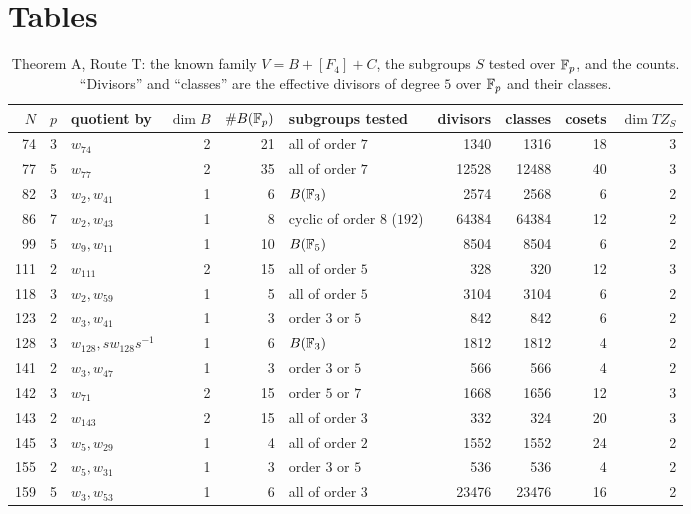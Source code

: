 \section{Tables}\label{sec:tables}



\begingroup\small

\endgroup

\begingroup\small

\endgroup

\begin{table}[ht]\centering\small
\caption{Projections to intermediate curves (other than $X_0$) used in the proof of Theorem B.}\label{tab:projection}

\end{table}



\begin{table}[ht]\centering\small
\caption{Theorem A, Route T: the known family $V=B+[F_4]+C$, the subgroups $S$ tested over $\mathbb{F}_p$, and the
counts. ``Divisors'' and ``classes'' are the effective divisors of degree $5$ over $\mathbb{F}_p$ and their classes.}
\label{tab:routeT}
\setlength{\tabcolsep}{4pt}
\begin{tabular}{rrlrrlrrrr}\toprule
$N$&$p$&quotient by&$\dim B$&$\#B(\mathbb{F}_p)$&subgroups tested&divisors&classes&cosets&$\dim T Z_S$\\\midrule
74&3&$w_{74}$&2&21&all of order $7$&1340&1316&18&3\\
77&5&$w_{77}$&2&35&all of order $7$&12528&12488&40&3\\
82&3&$w_2,w_{41}$&1&6&$B(\mathbb{F}_3)$&2574&2568&6&2\\
86&7&$w_2,w_{43}$&1&8&cyclic of order $8$ ($192$)&64384&64384&12&2\\
99&5&$w_9,w_{11}$&1&10&$B(\mathbb{F}_5)$&8504&8504&6&2\\
111&2&$w_{111}$&2&15&all of order $5$&328&320&12&3\\
118&3&$w_2,w_{59}$&1&5&all of order $5$&3104&3104&6&2\\
123&2&$w_3,w_{41}$&1&3&order $3$ or $5$&842&842&6&2\\
128&3&$w_{128},sw_{128}s^{-1}$&1&6&$B(\mathbb{F}_3)$&1812&1812&4&2\\
141&2&$w_3,w_{47}$&1&3&order $3$ or $5$&566&566&4&2\\
142&3&$w_{71}$&2&15&order $5$ or $7$&1668&1656&12&3\\
143&2&$w_{143}$&2&15&all of order $3$&332&324&20&3\\
145&3&$w_5,w_{29}$&1&4&all of order $2$&1552&1552&24&2\\
155&2&$w_5,w_{31}$&1&3&order $3$ or $5$&536&536&4&2\\
159&5&$w_3,w_{53}$&1&6&all of order $3$&23476&23476&16&2\\\bottomrule
\end{tabular}
\end{table}

